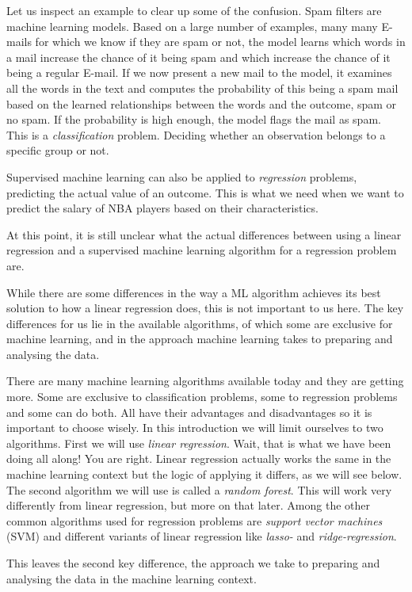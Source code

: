 \documentclass[
]{book}
\begin{document}
Let us inspect an example to clear up some of the confusion. Spam filters are
machine learning models. Based on a large number of examples, many many E-mails
for which we know if they are spam or not, the model learns which words in a
mail increase the chance of it being spam and which increase the chance of it
being a regular E-mail.
If we now present a new mail to the model, it examines all the
words in the text and computes the probability of this being a spam mail based
on the learned relationships between the words and the outcome, spam or no spam.
If the probability is high enough, the model flags the mail as spam. This is a
\emph{classification} problem. Deciding whether an observation belongs to a specific
group or not.

Supervised machine learning can also be applied to \emph{regression} problems,
predicting the actual value of an outcome. This is what we need when we want to
predict the salary of NBA players based on their characteristics.

At this point, it is still unclear what the actual differences between using a
linear regression and a supervised machine learning algorithm for a regression
problem are.

While there are some differences in the way a ML algorithm achieves its best
solution to how a linear regression does, this is not important to us here.
The key differences for us lie in the available algorithms, of which some are
exclusive for machine learning, and in the approach machine learning takes to
preparing and analysing the data.

There are many machine learning algorithms available today and they are getting
more. Some are exclusive to classification problems, some to regression problems
and some can do both. All have their advantages and disadvantages so it is
important to choose wisely. In this introduction we will limit ourselves to two
algorithms. First we will use \emph{linear regression}. Wait, that is what we have
been doing all along! You are right. Linear regression actually works the same
in the machine learning context but the logic of applying it differs, as we will
see below. The second algorithm we will use is called a \emph{random forest}. This
will work very differently from linear regression, but more on that later.
Among the other common algorithms used for regression problems are
\emph{support vector machines} (SVM) and different variants of linear regression like
\emph{lasso-} and \emph{ridge-regression}.

This leaves the second key difference, the approach we take to preparing and
analysing the data in the machine learning context.
\end{document}
